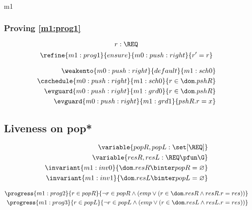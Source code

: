 \documentclass[12pt]{amsart}
\begin{document}
\begin{machine}{m1}
\subsubsection{Proving \ref{m1:prog1}}
\[ \indices{m0:push:right}{ r : \REQ } \]
\begin{align*}
\refine{m1:prog1}{ensure}{m0:push:right}{ \index{r}{r' = r} }
\end{align*}

\begin{align*}
\weakento{m0:push:right}{default}{m1:sch0}
\\ \cschedule{m0:push:right}{m1:sch0}{ r \in \dom.pshR }
\\ \evguard{m0:push:right}{m1:grd0}{ r \in \dom.pshR }
\\ \evguard{m0:push:right}{m1:grd1}{ pshR.r = x }
\end{align*}

\subsection{Liveness on pop*}

\begin{align*}
\variable{ popR, popL : \set [\REQ]}
\\ \variable{ resR, resL : \REQ \pfun \G }
\\ \invariant{m1:inv0}{ \dom.resR \binter popR = \emptyset }
\\ \invariant{m1:inv1}{ \dom.resL \binter popL = \emptyset }
\end{align*}

\begin{align*}
\progress{m1:prog2}{ r \in popR }{ \neg r \in popR \land (emp \lor (r \in \dom.resR \land resR.r = res))  }
\\ \progress{m1:prog3}{ r \in popL }{ \neg r \in popL \land (emp \lor (r \in \dom.resL \land resL.r = res))  }
\end{align*}


\end{machine}
\end{document}

